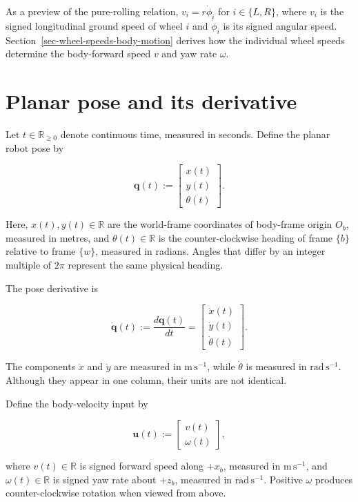 \documentclass[
  australian,
  12pt,
  letterpaper,
  DIV=11,
  numbers=noendperiod,
  twoside]{scrreprt}
\begin{document}
As a preview of the pure-rolling relation, \(v_i=r\dot\phi_i\) for
\(i\in\{L,R\}\), where \(v_i\) is the signed longitudinal ground speed
of wheel \(i\) and \(\dot\phi_i\) is its signed angular speed.
Section~\ref{sec-wheel-speeds-body-motion} derives how the individual
wheel speeds determine the body-forward speed \(v\) and yaw rate
\(\omega\).

\section{Planar pose and its
derivative}\label{planar-pose-and-its-derivative}

Let \(t\in\mathbb R_{\geq0}\) denote continuous time, measured in
seconds. Define the planar robot pose by

\[
\mathbf q(t)
\mathrel{:=}
\begin{bmatrix}
x(t)\\
y(t)\\
\theta(t)
\end{bmatrix}.
\]

Here, \(x(t),y(t)\in\mathbb R\) are the world-frame coordinates of
body-frame origin \(O_b\), measured in metres, and
\(\theta(t)\in\mathbb R\) is the counter-clockwise heading of frame
\(\{b\}\) relative to frame \(\{w\}\), measured in radians. Angles that
differ by an integer multiple of \(2\pi\) represent the same physical
heading.

The pose derivative is

\[
\dot{\mathbf q}(t)
\mathrel{:=}
\frac{d\mathbf q(t)}{dt}
=
\begin{bmatrix}
\dot x(t)\\
\dot y(t)\\
\dot\theta(t)
\end{bmatrix}.
\]

The components \(\dot x\) and \(\dot y\) are measured in
\(\mathrm{m\,s^{-1}}\), while \(\dot\theta\) is measured in
\(\mathrm{rad\,s^{-1}}\). Although they appear in one column, their
units are not identical.

Define the body-velocity input by

\[
\mathbf u(t)
\mathrel{:=}
\begin{bmatrix}
v(t)\\
\omega(t)
\end{bmatrix},
\]

where \(v(t)\in\mathbb R\) is signed forward speed along \(+x_b\),
measured in \(\mathrm{m\,s^{-1}}\), and \(\omega(t)\in\mathbb R\) is
signed yaw rate about \(+z_b\), measured in \(\mathrm{rad\,s^{-1}}\).
Positive \(\omega\) produces counter-clockwise rotation when viewed from
above.
\end{document}
